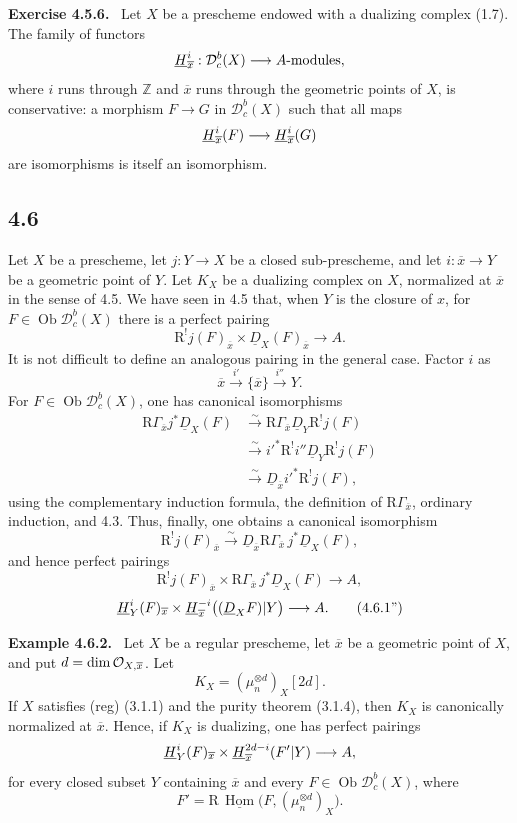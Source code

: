 \documentclass[11pt]{article}
\theoremstyle{plain}
\theoremstyle{definition}
\theoremstyle{remark}
\newenvironment{statement}[1]{\par\medskip\noindent\textbf{#1.}\ }{\par\medskip}
\newcommand{\ZZ}{\mathbb Z}
\newcommand{\D}{\mathcal D}\newcommand{\E}{\mathcal E}\newcommand{\F}{\mathcal F}
\DeclareMathOperator{\Hom}{Hom}
\DeclareMathOperator{\ob}{Ob}
\newcommand{\ol}[1]{\overline{#1}}
\newcommand{\R}{\mathrm R}
\begin{document}
\begin{statement}{Exercise 4.5.6}
Let $X$ be a prescheme endowed with a dualizing complex (1.7). The family of functors
\[
   \uH^i_{\ol x}:\D_c^b(X)\longrightarrow A\text{-modules},
\]
where $i$ runs through $\ZZ$ and $\ol x$ runs through the geometric points of $X$, is conservative: a morphism $F\to G$ in $\D_c^b(X)$ such that all maps
\[
   \uH^i_{\ol x}(F)\longrightarrow \uH^i_{\ol x}(G)
\]
are isomorphisms is itself an isomorphism.
\end{statement}

\subsection*{4.6}
Let $X$ be a prescheme, let $j:Y\to X$ be a closed sub-prescheme, and let $i:\ol x\to Y$ be a geometric point of $Y$. Let $K_X$ be a dualizing complex on $X$, normalized at $\ol x$ in the sense of 4.5. We have seen in 4.5 that, when $Y$ is the closure of $x$, for $F\in\ob\D_c^b(X)$ there is a perfect pairing
\[
   \R^!j(F)_{\ol x}\times \underline D_X(F)_{\ol x}\longrightarrow A.
\]
It is not difficult to define an analogous pairing in the general case. Factor $i$ as
\[
   \ol x\xrightarrow{i'}\{\ol x\}\xrightarrow{i''}Y.
\]
For $F\in\ob\D_c^b(X)$, one has canonical isomorphisms
\[
\begin{aligned}
\R\Gamma_{\ol x}j^*\underline D_X(F)
&\xrightarrow{\sim}\R\Gamma_{\ol x}\underline D_Y\R^!j(F)\\
&\xrightarrow{\sim}i'^*\R^!i''\underline D_Y\R^!j(F)\\
&\xrightarrow{\sim}\underline D_{\ol x}i'^*\R^!j(F),
\end{aligned}
\]
using the complementary induction formula, the definition of $\R\Gamma_{\ol x}$, ordinary induction, and 4.3. Thus, finally, one obtains a canonical isomorphism
\[
   \R^!j(F)_{\ol x}
      \xrightarrow{\sim}
   \underline D_{\ol x}\R\Gamma_{\ol x}\,j^*\underline D_X(F),\tag{4.6.1}
\]
and hence perfect pairings
\[
   \R^!j(F)_{\ol x}\times
   \R\Gamma_{\ol x}\,j^*\underline D_X(F)\longrightarrow A,
\]
\[
   \uH^i_Y(F)_{\ol x}\times
   \uH^{-i}_{\ol x}\bigl((\underline D_XF)|Y\bigr)
      \longrightarrow A.\tag{4.6.1''}
\]

\begin{statement}{Example 4.6.2}
Let $X$ be a regular prescheme, let $\ol x$ be a geometric point of $X$, and put $d=\dim\cO_{X,\ol x}$. Let
\[
   K_X=(\mu_n^{\otimes d})_X[2d].
\]
If $X$ satisfies (reg) (3.1.1) and the purity theorem (3.1.4), then $K_X$ is canonically normalized at $\ol x$. Hence, if $K_X$ is dualizing, one has perfect pairings
\[
   \uH^i_Y(F)_{\ol x}\times
      \uH^{2d-i}_{\ol x}(F'|Y)\longrightarrow A,
\]
for every closed subset $Y$ containing $\ol x$ and every $F\in\ob\D_c^b(X)$, where
\[
   F'=\R\,\underline{\Hom}\bigl(F,(\mu_n^{\otimes d})_X\bigr).
\]
\end{statement}
\end{document}
